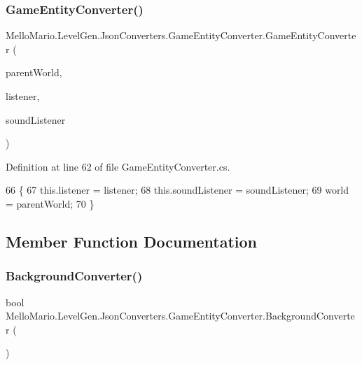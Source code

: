 \subsubsection{Game\+Entity\+Converter()}
{\footnotesize\ttfamily Mello\+Mario.\+Level\+Gen.\+Json\+Converters.\+Game\+Entity\+Converter.\+Game\+Entity\+Converter (\begin{DoxyParamCaption}\item[{\textbf{ I\+World}}]{parent\+World,  }\item[{\textbf{ I\+Listener}$<$ \textbf{ I\+Game\+Object} $>$}]{listener,  }\item[{\textbf{ I\+Listener}$<$ \textbf{ I\+Soundable} $>$}]{sound\+Listener }\end{DoxyParamCaption})}



Definition at line 62 of file Game\+Entity\+Converter.\+cs.


\begin{DoxyCode}
66         \{
67             this.listener = listener;
68             this.soundListener = soundListener;
69             world = parentWorld;
70         \}
\end{DoxyCode}


\subsection{Member Function Documentation}
\mbox{\label{classMelloMario_1_1LevelGen_1_1JsonConverters_1_1GameEntityConverter_a5acbbe4ccfab619de11cd646a6720ca0}} 
\subsubsection{Background\+Converter()}
{\footnotesize\ttfamily bool Mello\+Mario.\+Level\+Gen.\+Json\+Converters.\+Game\+Entity\+Converter.\+Background\+Converter (\begin{DoxyParamCaption}{ }\end{DoxyParamCaption})\hspace{0.3cm}{\ttfamily [private]}}



